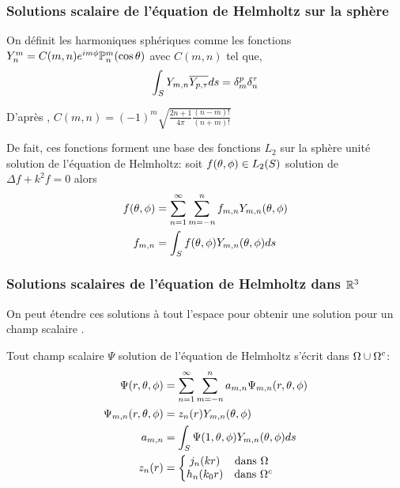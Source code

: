 \subsubsection{Solutions scalaire de l'équation de Helmholtz sur la sphère}

On définit les harmoniques sphériques comme les fonctions \(Y_n^m = C(m,n) e^{im\phi}\mathbb{P}^m_n(\cos \theta) \) avec \(C(m,n)\) tel que,
\[
 \displaystyle\int_S Y_{m,n} {\overline{Y_{p,\tau}}} ds = \delta_m^p \delta_n^\tau
\]

D’après \cite[p.~24]{nedelec_acoustic_2001}, \( C(m,n) = (-1)^m\sqrt{\frac{2n+1}{4\pi}\frac{(n-m)!}{(n+m)!}}\)

De fait, ces fonctions forment une base des fonctions \(L_2\) sur la sphère unité solution de l'équation de Helmholtz: soit \(f(\theta,\phi) \in L_2(S)\) solution de \( \Delta f + k^2 f = 0 \) alors
  \begin{align}
    f(\theta,\phi) &= \sum\limits_{n=1}^\infty\sum\limits_{m=-n}^n f_{m,n} Y_{m,n} (\theta,\phi)\\
    \notag f_{m,n} &= \int_S f(\theta,\phi) Y_{m,n}(\theta,\phi) ds
  \end{align}


\subsubsection{Solutions scalaires de l'équation de Helmholtz dans \(\mathbb R^3\)}
On peut étendre ces solutions à tout l'espace pour obtenir une solution pour un champ scalaire .

Tout champ scalaire \(\Psi\) solution de l'équation de Helmholtz s'écrit dans \(\Omega\cup\Omega^c\):
\begin{align}
\label{eq:helm:sol_helmoltz_scal_somme}
\Psi(r,\theta,\phi) &= \sum\limits_{n=1}^\infty\sum\limits_{m=-n}^n a_{m,n} \Psi_{m,n}(r,\theta,\phi) \\
\Psi_{m,n}(r,\theta,\phi) &= z_n(r) Y_{m,n}(\theta,\phi) \\
\notag a_{m,n} &= \int_S \Psi(1,\theta,\phi) Y_{m,n}(\theta,\phi) ds \\
z_n(r) &= \left\lbrace
  \begin{matrix}
  j_n(kr) &   \text{dans \(\Omega~\)} \\
  h_n(k_0r) & \text{dans \(\Omega^c\)} \\
  \end{matrix}\right.
\end{align}
